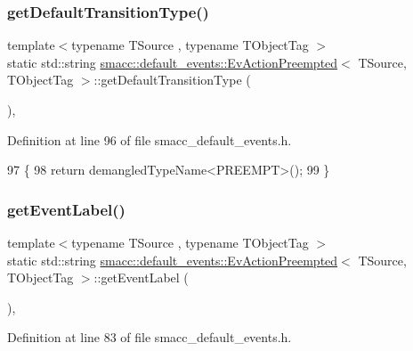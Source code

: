 \subsubsection{\texorpdfstring{get\+Default\+Transition\+Type()}{getDefaultTransitionType()}}
{\footnotesize\ttfamily template$<$typename T\+Source , typename T\+Object\+Tag $>$ \\
static std\+::string \hyperlink{structsmacc_1_1default__events_1_1EvActionPreempted}{smacc\+::default\+\_\+events\+::\+Ev\+Action\+Preempted}$<$ T\+Source, T\+Object\+Tag $>$\+::get\+Default\+Transition\+Type (\begin{DoxyParamCaption}{ }\end{DoxyParamCaption})\hspace{0.3cm}{\ttfamily [inline]}, {\ttfamily [static]}}



Definition at line 96 of file smacc\+\_\+default\+\_\+events.\+h.


\begin{DoxyCode}
97   \{
98     \textcolor{keywordflow}{return} demangledTypeName<PREEMPT>();
99   \}
\end{DoxyCode}
\mbox{\label{structsmacc_1_1default__events_1_1EvActionPreempted_ae872ff61b26c07446358f41be00c8f59}} 
\subsubsection{\texorpdfstring{get\+Event\+Label()}{getEventLabel()}}
{\footnotesize\ttfamily template$<$typename T\+Source , typename T\+Object\+Tag $>$ \\
static std\+::string \hyperlink{structsmacc_1_1default__events_1_1EvActionPreempted}{smacc\+::default\+\_\+events\+::\+Ev\+Action\+Preempted}$<$ T\+Source, T\+Object\+Tag $>$\+::get\+Event\+Label (\begin{DoxyParamCaption}{ }\end{DoxyParamCaption})\hspace{0.3cm}{\ttfamily [inline]}, {\ttfamily [static]}}



Definition at line 83 of file smacc\+\_\+default\+\_\+events.\+h.


